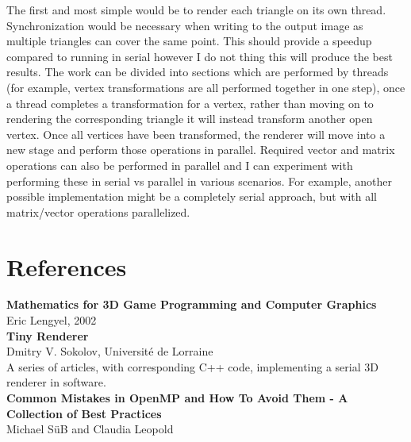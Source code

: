 \documentclass[12pt]{jhwhw}
\begin{document}
\bigbreak
The first and most simple would be to render each triangle on its own thread. Synchronization
would be necessary when writing to the output image as multiple triangles can cover
the same point. This should provide a speedup compared to running in serial however I do
not thing this will produce the best results. The work can be divided into sections which
are performed by threads (for example, vertex transformations are all performed together in
one step), once a thread completes a transformation for a vertex, rather than moving
on to rendering the corresponding triangle it will instead transform another open vertex.
Once all vertices have been transformed, the renderer will move into a new stage and perform
those operations in parallel. Required vector and matrix operations can also be performed
in parallel and I can experiment with performing these in serial vs parallel in various scenarios.
For example, another possible implementation might be a completely serial approach, but with
all matrix/vector operations parallelized.

\section*{References}
\textbf{Mathematics for 3D Game Programming and Computer Graphics} \\
Eric Lengyel, 2002 \\

\bigbreak
\textbf{Tiny Renderer} \\
Dmitry V. Sokolov, Universit\'e de Lorraine \\
A series of articles, with corresponding C++ code, implementing
a serial 3D renderer in software. \\

\bigbreak
\textbf{Common Mistakes in OpenMP and How To Avoid Them - A Collection of Best Practices} \\
Michael S\"uB and Claudia Leopold
\end{document}
